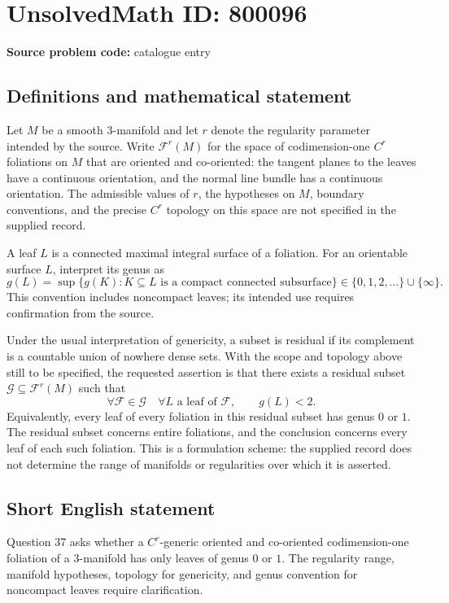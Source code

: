 \documentclass[11pt]{article}
\begin{document}
\section*{UnsolvedMath ID: 800096}
\textbf{Source problem code:} catalogue entry
\subsection{Definitions and mathematical statement}
Let \(M\) be a smooth \(3\)-manifold and let \(r\) denote the regularity parameter intended by the source. Write \(\mathscr F^r(M)\) for the space of codimension-one \(C^r\) foliations on \(M\) that are oriented and co-oriented: the tangent planes to the leaves have a continuous orientation, and the normal line bundle has a continuous orientation. The admissible values of \(r\), the hypotheses on \(M\), boundary conventions, and the precise \(C^r\) topology on this space are not specified in the supplied record.

A leaf \(L\) is a connected maximal integral surface of a foliation. For an orientable surface \(L\), interpret its genus as
\[
 g(L)=\sup\{g(K):K\subseteq L\text{ is a compact connected subsurface}\}\in\{0,1,2,\ldots\}\cup\{\infty\}.
\]
This convention includes noncompact leaves; its intended use requires confirmation from the source.

Under the usual interpretation of genericity, a subset is residual if its complement is a countable union of nowhere dense sets. With the scope and topology above still to be specified, the requested assertion is that there exists a residual subset \(\mathcal G\subseteq\mathscr F^r(M)\) such that
\[
 \forall\mathcal F\in\mathcal G\quad
 \forall L\text{ a leaf of }\mathcal F,\qquad g(L)<2.
\]
Equivalently, every leaf of every foliation in this residual subset has genus \(0\) or \(1\). The residual subset concerns entire foliations, and the conclusion concerns every leaf of each such foliation. This is a formulation scheme: the supplied record does not determine the range of manifolds or regularities over which it is asserted.
\subsection{Short English statement}
Question 37 asks whether a \(C^r\)-generic oriented and co-oriented codimension-one foliation of a \(3\)-manifold has only leaves of genus \(0\) or \(1\). The regularity range, manifold hypotheses, topology for genericity, and genus convention for noncompact leaves require clarification.
\end{document}
